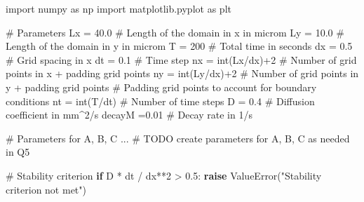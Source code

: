 \documentclass[
  letterpaper,
  DIV=11,
  numbers=noendperiod]{scrreprt}
\newenvironment{Shaded}{\begin{snugshade}}{\end{snugshade}}
\newcommand{\AlertTok}[1]{\textcolor[rgb]{0.68,0.00,0.00}{#1}}
\newcommand{\BuiltInTok}[1]{\textcolor[rgb]{0.00,0.23,0.31}{#1}}
\newcommand{\CommentTok}[1]{\textcolor[rgb]{0.37,0.37,0.37}{#1}}
\newcommand{\ControlFlowTok}[1]{\textcolor[rgb]{0.00,0.23,0.31}{\textbf{#1}}}
\newcommand{\DecValTok}[1]{\textcolor[rgb]{0.68,0.00,0.00}{#1}}
\newcommand{\FloatTok}[1]{\textcolor[rgb]{0.68,0.00,0.00}{#1}}
\newcommand{\ImportTok}[1]{\textcolor[rgb]{0.00,0.46,0.62}{#1}}
\newcommand{\NormalTok}[1]{\textcolor[rgb]{0.00,0.23,0.31}{#1}}
\newcommand{\OperatorTok}[1]{\textcolor[rgb]{0.37,0.37,0.37}{#1}}
\newcommand{\PreprocessorTok}[1]{\textcolor[rgb]{0.68,0.00,0.00}{#1}}
\newcommand{\StringTok}[1]{\textcolor[rgb]{0.13,0.47,0.30}{#1}}
\theoremstyle{definition}
\theoremstyle{remark}
\begin{document}
\begin{tcolorbox}[enhanced jigsaw, left=2mm, opacitybacktitle=0.6, toptitle=1mm, colbacktitle=quarto-callout-note-color!10!white, toprule=.15mm, coltitle=black, colframe=quarto-callout-note-color-frame, opacityback=0, title=\textcolor{quarto-callout-note-color}{\faInfo}\hspace{0.5em}{Starting code for this practical}, breakable, bottomtitle=1mm, rightrule=.15mm, titlerule=0mm, arc=.35mm, leftrule=.75mm, bottomrule=.15mm, colback=white]

\begin{Shaded}
\begin{Highlighting}[]
\ImportTok{import}\NormalTok{ numpy }\ImportTok{as}\NormalTok{ np}
\ImportTok{import}\NormalTok{ matplotlib.pyplot }\ImportTok{as}\NormalTok{ plt}

\CommentTok{\# Parameters}
\NormalTok{Lx }\OperatorTok{=} \FloatTok{40.0}  \CommentTok{\# Length of the domain in x in microm}
\NormalTok{Ly }\OperatorTok{=} \FloatTok{10.0}  \CommentTok{\# Length of the domain in y in microm}
\NormalTok{T }\OperatorTok{=} \DecValTok{200}  \CommentTok{\# Total time in seconds}
\NormalTok{dx }\OperatorTok{=} \FloatTok{0.5}  \CommentTok{\# Grid spacing in x}
\NormalTok{dt }\OperatorTok{=} \FloatTok{0.1}  \CommentTok{\# Time step}
\NormalTok{nx }\OperatorTok{=} \BuiltInTok{int}\NormalTok{(Lx}\OperatorTok{/}\NormalTok{dx)}\OperatorTok{+}\DecValTok{2}  \CommentTok{\# Number of grid points in x + padding grid points}
\NormalTok{ny }\OperatorTok{=} \BuiltInTok{int}\NormalTok{(Ly}\OperatorTok{/}\NormalTok{dx)}\OperatorTok{+}\DecValTok{2}  \CommentTok{\# Number of grid points in y + padding grid points}
\CommentTok{\# Padding grid points to account for boundary conditions}
\NormalTok{nt }\OperatorTok{=} \BuiltInTok{int}\NormalTok{(T}\OperatorTok{/}\NormalTok{dt)  }\CommentTok{\# Number of time steps}
\NormalTok{D }\OperatorTok{=} \FloatTok{0.4}  \CommentTok{\# Diffusion coefficient in mm\^{}2/s}
\NormalTok{decayM }\OperatorTok{=}\FloatTok{0.01} \CommentTok{\# Decay rate in 1/s}


\CommentTok{\# Parameters for A, B, C}
\NormalTok{... }\CommentTok{\# }\AlertTok{TODO}\CommentTok{ create parameters for A, B, C as needed in Q5}

\CommentTok{\# Stability criterion}
\ControlFlowTok{if}\NormalTok{ D }\OperatorTok{*}\NormalTok{ dt }\OperatorTok{/}\NormalTok{ dx}\OperatorTok{**}\DecValTok{2} \OperatorTok{\textgreater{}} \FloatTok{0.5}\NormalTok{:}
    \ControlFlowTok{raise} \PreprocessorTok{ValueError}\NormalTok{(}\StringTok{"Stability criterion not met"}\NormalTok{)}


\end{Highlighting}
\end{Shaded}
\end{tcolorbox}
\end{document}

